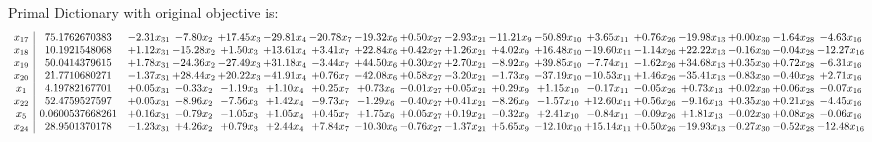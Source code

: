 \documentclass[9pt]{article}
\begin{document}
Primal Dictionary with original objective is:
\[\begin{array}{c| c c@{\hskip 2pt} c@{\hskip 2pt} c@{\hskip 2pt} c@{\hskip 2pt} c@{\hskip 2pt} c@{\hskip 2pt} c@{\hskip 2pt} c@{\hskip 2pt} c@{\hskip 2pt} c@{\hskip 2pt} c@{\hskip 2pt} c@{\hskip 2pt} c@{\hskip 2pt} c@{\hskip 2pt} c@{\hskip 2pt} c@{\hskip 2pt} }
 x_{17}   &  75.1762670383 & -2.31 x_{31} & -7.80 x_{2} & + 17.45 x_{3} & -29.81 x_{4} & -20.78 x_{7} & -19.32 x_{6} & +  0.50 x_{27} & -2.93 x_{21} & -11.21 x_{9} & -50.89 x_{10} & +  3.65 x_{11} & +  0.76 x_{26} & -19.98 x_{13} & +  0.00 x_{30} & -1.64 x_{28} & -4.63 x_{16}\\
 x_{18}   &  10.1921548068 & +  1.12 x_{31} & -15.28 x_{2} & +  1.50 x_{3} & + 13.61 x_{4} & +  3.41 x_{7} & + 22.84 x_{6} & +  0.42 x_{27} & +  1.26 x_{21} & +  4.02 x_{9} & + 16.48 x_{10} & -19.60 x_{11} & -1.14 x_{26} & + 22.22 x_{13} & -0.16 x_{30} & -0.04 x_{28} & -12.27 x_{16}\\
 x_{19}   &  50.0414379615 & +  1.78 x_{31} & -24.36 x_{2} & -27.49 x_{3} & + 31.18 x_{4} & -3.44 x_{7} & + 44.50 x_{6} & +  0.30 x_{27} & +  2.70 x_{21} & -8.92 x_{9} & + 39.85 x_{10} & -7.74 x_{11} & -1.62 x_{26} & + 34.68 x_{13} & +  0.35 x_{30} & +  0.72 x_{28} & -6.31 x_{16}\\
 x_{20}   &  21.7710680271 & -1.37 x_{31} & + 28.44 x_{2} & + 20.22 x_{3} & -41.91 x_{4} & +  0.76 x_{7} & -42.08 x_{6} & +  0.58 x_{27} & -3.20 x_{21} & -1.73 x_{9} & -37.19 x_{10} & -10.53 x_{11} & +  1.46 x_{26} & -35.41 x_{13} & -0.83 x_{30} & -0.40 x_{28} & +  2.71 x_{16}\\
 x_{1}   &  4.19782167701 & +  0.05 x_{31} & -0.33 x_{2} & -1.19 x_{3} & +  1.10 x_{4} & +  0.25 x_{7} & +  0.73 x_{6} & -0.01 x_{27} & +  0.05 x_{21} & +  0.29 x_{9} & +  1.15 x_{10} & -0.17 x_{11} & -0.05 x_{26} & +  0.73 x_{13} & +  0.02 x_{30} & +  0.06 x_{28} & -0.07 x_{16}\\
 x_{22}   &  52.4759527597 & +  0.05 x_{31} & -8.96 x_{2} & -7.56 x_{3} & +  1.42 x_{4} & -9.73 x_{7} & -1.29 x_{6} & -0.40 x_{27} & +  0.41 x_{21} & -8.26 x_{9} & -1.57 x_{10} & + 12.60 x_{11} & +  0.56 x_{26} & -9.16 x_{13} & +  0.35 x_{30} & +  0.21 x_{28} & -4.45 x_{16}\\
 x_{5}   &  0.0600537668261 & +  0.16 x_{31} & -0.79 x_{2} & -1.05 x_{3} & +  1.05 x_{4} & +  0.45 x_{7} & +  1.75 x_{6} & +  0.05 x_{27} & +  0.19 x_{21} & -0.32 x_{9} & +  2.41 x_{10} & -0.84 x_{11} & -0.09 x_{26} & +  1.81 x_{13} & -0.02 x_{30} & +  0.08 x_{28} & -0.06 x_{16}\\
 x_{24}   &  28.9501370178 & -1.23 x_{31} & +  4.26 x_{2} & +  0.79 x_{3} & +  2.44 x_{4} & +  7.84 x_{7} & -10.30 x_{6} & -0.76 x_{27} & -1.37 x_{21} & +  5.65 x_{9} & -12.10 x_{10} & + 15.14 x_{11} & +  0.50 x_{26} & -19.93 x_{13} & -0.27 x_{30} & -0.52 x_{28} & -12.48 x_{16}\\

\end{array}\]
\end{document}
